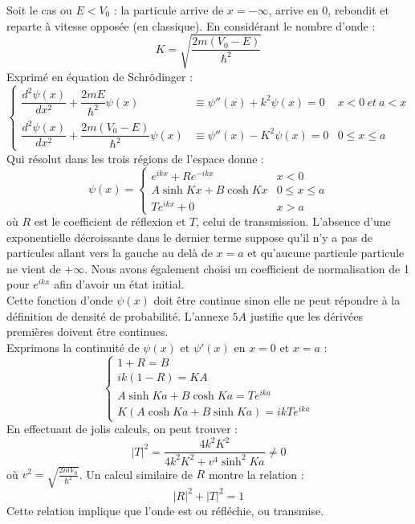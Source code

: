 \documentclass	[11pt, a4paper, openany]{book}
\begin{document}
	Soit le cas ou $E < V_0$ : la particule arrive de $x = -\infty$, arrive en 0, rebondit et reparte à vitesse opposée (en classique). En considérant le nombre d'onde :
	\begin{equation}
		K = \sqrt{\frac{2m(V_0 - E)}{\hbar^2}}
	\end{equation}
	Exprimé en équation de Schrödinger :
	\begin{equation}
		\left\{\begin{array}{lll}
		\dfrac{d^2\psi(x)}{dx^2} + \dfrac{2mE}{\hbar^2}\psi(x)  & \equiv \psi''(x) + k^2\psi(x) = 0 & x<0\ et\ a < x\\
		\dfrac{d^2\psi(x)}{dx^2} + \dfrac{2m(V_0-E)}{\hbar^2}\psi(x)  & \equiv \psi''(x) -K^2\psi(x) = 0 & 0 \leq x \leq a
		\end{array}\right.
	\end{equation}
	Qui résolut dans les trois régions de l'espace donne : 
	\begin{equation}
		\psi(x) = \left\{\begin{array}{ll}
		e^{ikx} + Re^{-ikx} & x<0\\
		A\sinh Kx + B\cosh Kx & 0\leq x \leq a\\
		Te^{ikx} + 0 & x > a
		\end{array}\right.
	\end{equation}
	où $R$ est le coefficient de réflexion et $T$, celui de transmission. L'absence d'une exponentielle décroissante dans le dernier terme suppose qu'il n'y a pas de particules allant vers la gauche au delà de $x=a$ et qu'aucune particule particule ne vient de $+\infty$. Nous avons également choisi un coefficient de normalisation de 1 pour $e^{ikx}$ afin d'avoir un état initial.\\
	
	Cette fonction d'onde $\psi(x)$ doit être continue sinon elle ne peut répondre à la définition de densité de probabilité. L'annexe $5A$ justifie que les dérivées premières doivent être continues.\\
	Exprimons la continuité de $\psi(x)$ et $\psi'(x)$ en $x=0$ et $x=a$ :
	\begin{equation}
		\left\{\begin{array}{l}
		1+R = B\\
		ik(1-R) = KA\\
		A\sinh Ka + B\cosh Ka = Te^{ika}\\
		K(A\cosh Ka + B\sinh Ka) = ikTe^{ika}
		\end{array}\right.
	\end{equation}
	En effectuant de jolis calculs, on peut trouver :
	\begin{equation}
		|T|^2 = \dfrac{4k^2K^2}{4k^2K^2 + v^4\sinh^2 Ka} \neq 0
	\end{equation}
	où $v^2 = \sqrt{\frac{2mV_0}{\hbar^2}}$. Un calcul similaire de $R$ montre la relation :
	\begin{equation}
		|R|^2 + |T|^2 = 1
	\end{equation}
	Cette relation implique que l'onde est ou réfléchie, ou transmise.\\
	
\end{document}
